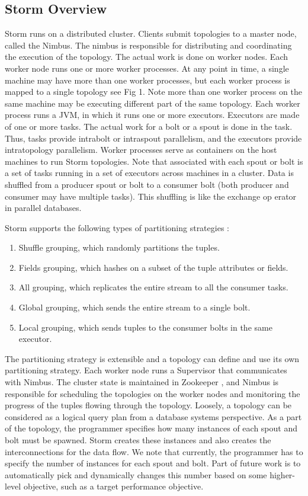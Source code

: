 \documentclass[9pt,twocolumn,twoside]{../../styles/osajnl}
\begin{document}
\subsection{Storm Overview}
Storm runs on a distributed cluster. Clients submit topologies to a
master node, called the Nimbus. The nimbus is responsible for
distributing and coordinating the execution of the topology. The
actual work is done on worker nodes. Each worker node runs one or more
worker processes. At any point in time, a single machine may have more
than one worker processes, but each worker process is mapped to a
single topology see Fig 1. Note more than one worker process on the same machine
may be executing different part of the same topology. Each worker
process runs a JVM, in which it runs one or more executors. Executors
are made of one or more tasks. The actual work for a bolt or a spout
is done in the task. Thus, tasks provide intrabolt or intraspout
parallelism, and the executors provide intratopology
parallelism. Worker processes serve as containers on the host machines
to run Storm topologies. Note that associated with each spout or bolt
is a set of tasks running in a set of executors across machines in a
cluster. Data is shuffled from a producer spout or bolt to a consumer
bolt (both producer and consumer may have multiple tasks). This
shuffling is like the exchange op erator in parallel databases.

Storm supports the following types of partitioning strategies \cite{storm}:

\begin{enumerate}  
\item Shuffle grouping, which randomly partitions the tuples.
\item Fields grouping, which hashes on a subset of the tuple
  attributes or fields.
\item All grouping, which replicates the entire stream to all the
  consumer tasks.
\item Global grouping, which sends the entire stream to a single bolt.
\item Local grouping, which sends tuples to the consumer bolts in the
  same executor.
  
\end{enumerate}
The partitioning strategy is extensible and a topology can define and
use its own partitioning strategy.  Each worker node runs a Supervisor
that communicates with Nimbus.  The cluster state is maintained in
Zookeeper \cite{www-zookeeper}, and Nimbus is responsible for scheduling
the topologies on the worker nodes and monitoring the progress of the
tuples flowing through the topology. Loosely, a topology can be
considered as a logical query plan from a database systems
perspective. As a part of the topology, the programmer specifies how
many instances of each spout and bolt must be spawned. Storm creates
these instances and also creates the interconnections for the data
flow. We note that currently, the programmer has to specify the number
of instances for each spout and bolt. Part of future work is to
automatically pick and dynamically changes this number based on some
higher-level objective, such as a target performance objective.
\end{document}
